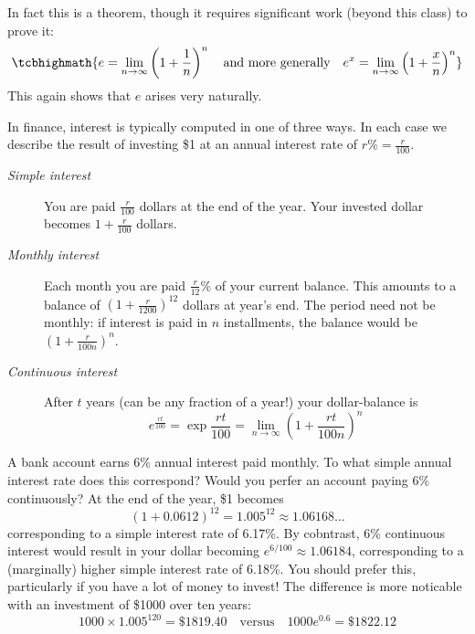 In fact this is a theorem, though it requires significant work (beyond this class) to prove it:
\[
	\tcbhighmath{e=\lim_{n\to\infty}\left(1+\frac 1n\right)^n\quad\text{and more generally}\quad e^x =\lim_{n\to\infty}\left(1+\frac xn\right)^n}
\]
This again shows that $e$ arises very naturally.


In finance, interest is typically computed in one of three ways. In each case we describe the result of investing \$1 at an annual interest rate of $r\%=\frac r{100}$.
\begin{description}
	\item[\normalfont\emph{Simple interest}] You are paid $\frac r{100}$ dollars at the end of the year. Your invested dollar becomes $1+\frac r{100}$ dollars.
	\item[\normalfont\emph{Monthly interest}] Each month you are paid $\frac r{12}$\% of your current balance. This amounts to a balance of $(1+\frac r{1200})^{12}$ dollars at year's end. The period need not be monthly: if interest is paid in $n$ installments, the balance would be $(1+\frac r{100n})^{n}$.
	\item[\normalfont\emph{Continuous interest}] After $t$ years (can be any fraction of a year!) your dollar-balance is
	\[
		e^{\frac{rt}{100}}=\exp\frac{rt}{100} =\lim_{n\to\infty}\left(1+\frac{rt}{100n}\right)^n
	\]
\end{description}

\begin{example}{}{}
	A bank account earns 6\% annual interest paid monthly. To what simple annual interest rate does this correspond? Would you perfer an account paying 6\% continuously?\smallbreak
	At the end of the year, \$1 becomes
	\[
	 	\left(1+{0.06}{12}\right)^{12}=1.005^{12}\approx 1.06168\ldots
	\]
	corresponding to a simple interest rate of 6.17\%. By cobntrast, 6\% continuous interest would result in your dollar becoming $e^{6/100}\approx 1.06184$, corresponding to a (marginally) higher simple interest rate of 6.18\%. You should prefer this, particularly if you have a lot of money to invest! The difference is more noticable with an investment of \$1000 over ten years:
	\[
		1000\times 1.005^{120}=\$1819.40
		\quad\text{versus}\quad
		1000e^{0.6}=\$1822.12
	\]
\end{example}

\goodbreak

